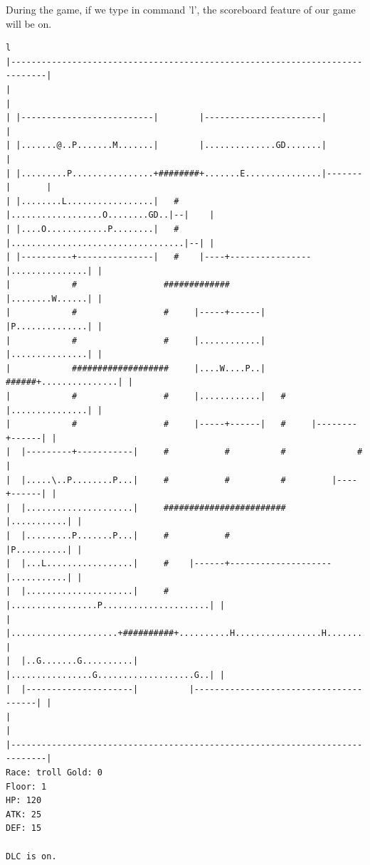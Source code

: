 \documentclass[11pt]{article}
\theoremstyle{plain}
\begin{document}
During the game, if we type in command 'l', the scoreboard feature of our
game will be on.
\begin{Verbatim}[fontsize=\scriptsize]
l
|-----------------------------------------------------------------------------|
|                                                                             |
| |--------------------------|        |-----------------------|               |
| |.......@..P.......M.......|        |..............GD.......|               |
| |.........P................+########+.......E...............|-------|       |
| |........L.................|   #    |..................O........GD..|--|    |
| |....O............P........|   #    |..................................|--| |
| |----------+---------------|   #    |----+----------------|...............| |
|            #                 #############                |........W......| |
|            #                 #     |-----+------|         |P..............| |
|            #                 #     |............|         |...............| |
|            ###################     |....W....P..|   ######+...............| |
|            #                 #     |............|   #     |...............| |
|            #                 #     |-----+------|   #     |--------+------| |
|  |---------+-----------|     #           #          #              #        |
|  |.....\..P........P...|     #           #          #         |----+------| |
|  |.....................|     ########################         |...........| |
|  |.........P.......P...|     #           #                    |P..........| |
|  |...L.................|     #    |------+--------------------|...........| |
|  |.....................|     #    |.................P.....................| |
|  |.....................+##########+..........H.................H..........| |
|  |..G.......G..........|          |................G...................G..| |
|  |---------------------|          |---------------------------------------| |
|                                                                             |
|-----------------------------------------------------------------------------|
Race: troll Gold: 0                                                    Floor: 1
HP: 120
ATK: 25
DEF: 15

DLC is on.
\end{Verbatim}
\end{document}
